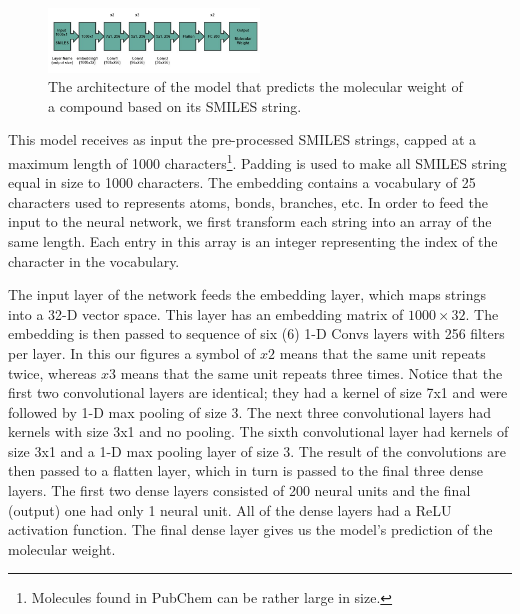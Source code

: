         \begin{figure}[htbp]
        \centering
        \includegraphics[width=0.5\textwidth]{figures/MW-model_arquitecture.jpg}
        \caption{The architecture of the model that predicts the molecular weight of a compound based on its SMILES string.}
        \label{fig:mw-architecture}
    \end{figure}
    This model  receives as input the pre-processed SMILES strings, capped at a maximum length of 1000 characters\footnote{Molecules found in PubChem can be rather large in size.}. Padding is used to make all SMILES string equal in size to 1000 characters. The embedding contains a vocabulary of 25 characters used to represents atoms, bonds, branches, etc. In order to feed the input to the neural network, we first transform each string into an array of the same length. Each entry 
    in this array is an integer representing the index of the character in the vocabulary. 
    
    The input layer of the network feeds the embedding layer, which maps strings into a  32-D vector space. This layer has an embedding matrix 
    of  $1000 \times 32$. The embedding is then passed to sequence of six (6)  1-D Convs layers with 256 filters per layer. 
    In this our figures a symbol of $x2$ means that the same unit repeats twice, whereas $x3$ means that the same unit repeats three times. 
Notice that the first two convolutional layers are identical; they had a kernel of size 7x1 and were followed by 1-D max pooling of size 3.
The next three convolutional  layers had  kernels with size 3x1 and no pooling. The sixth convolutional layer had kernels of size 3x1 
and a 1-D max pooling layer of size 3. The result of the convolutions are then passed to a flatten layer, which in turn is passed to the final three dense layers. The first two dense layers consisted of 200 neural units and the final (output) one had only 1 neural unit. All of the dense layers had a ReLU activation function. The final  dense layer gives us the model's prediction of the molecular weight.

